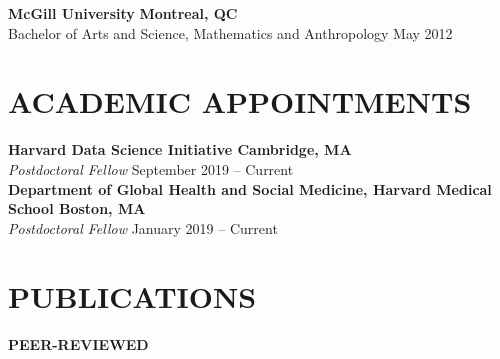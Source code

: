 \documentclass[12pt]{article}
\begin{document}
\textbf{McGill University} \hfill \hfill \textbf{Montreal, QC} \\
Bachelor of Arts and Science, Mathematics and Anthropology  \hfill \hfill May 2012 


\section*{\textbf{{\large A}CADEMIC {\large A}PPOINTMENTS }}

\textbf{Harvard Data Science Initiative \hfill \hfill Cambridge, MA} \\
\textit{Postdoctoral Fellow}  \hfill \hfill September 2019 -- Current \\

\textbf{Department of Global Health and Social Medicine, Harvard Medical School \hfill \hfill Boston, MA} \\
\textit{Postdoctoral Fellow} \hfill \hfill January 2019 -- Current 

\section*{\textbf{{\large P}{UBLICATIONS}}}

\noindent \textbf{PEER-REVIEWED}
\end{document}
